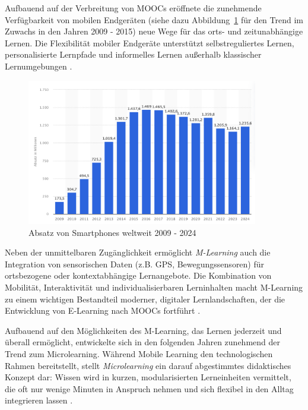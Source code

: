 Aufbauend auf der Verbreitung von MOOCs eröffnete die zunehmende Verfügbarkeit von mobilen Endgeräten (siehe dazu Abbildung~\ref{fig:absatz_smartphones} für den Trend im Zuwachs in den Jahren 2009 - 2015) neue Wege für das orts- und zeitunabhängige Lernen. Die Flexibilität mobiler Endgeräte unterstützt selbstreguliertes Lernen, personalisierte Lernpfade und informelles Lernen außerhalb klassischer Lernumgebungen \parencite[S.~306]{nolting_strukturiertes_2004}.

\begin{figure}[htbp]
    \centering
    \includegraphics[width=0.90\textwidth]{img/Absatz von Smartphones.png}
    \caption{Absatz von Smartphones weltweit 2009 - 2024	\cite{statista_absatz_2025}}
    \label{fig:absatz_smartphones}
\end{figure}

Neben der unmittelbaren Zugänglichkeit ermöglicht \textit{M-Learning} auch die Integration von sensorischen Daten (z.B. GPS, Bewegungssensoren) für ortsbezogene oder kontextabhängige Lernangebote. Die Kombination von Mobilität, Interaktivität und individualisierbaren Lerninhalten macht M-Learning zu einem wichtigen Bestandteil moderner, digitaler Lernlandschaften, der die Entwicklung von E‑Learning nach MOOCs fortführt \parencite[S.~10]{sharples_theory_2010}.
\fi

Aufbauend auf den Möglichkeiten des M-Learning, das Lernen jederzeit und überall ermöglicht, entwickelte sich in den folgenden Jahren zunehmend der Trend zum Microlearning. Während Mobile Learning den technologischen Rahmen bereitstellt, stellt \textit{Microlearning} ein darauf abgestimmtes didaktisches Konzept dar: Wissen wird in kurzen, modularisierten Lerneinheiten vermittelt, die oft nur wenige Minuten in Anspruch nehmen und sich flexibel in den Alltag integrieren lassen \parencites[S.~18ff]{hug_outline_2007}[S.~5ff]{buchem_microlearning_2010}.


